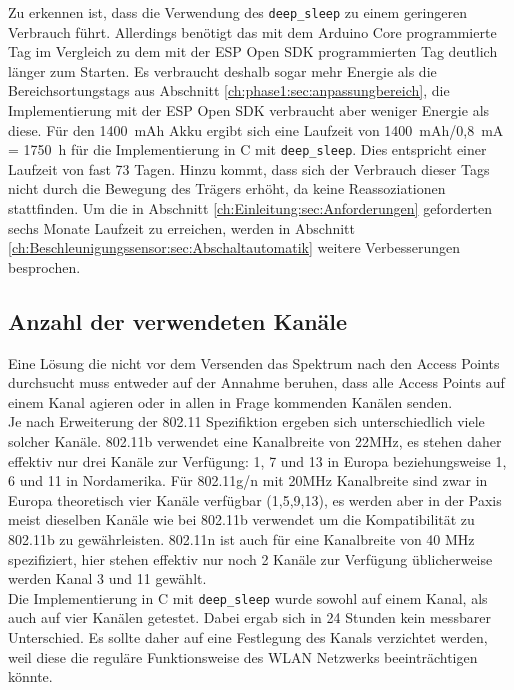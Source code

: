 
Zu erkennen ist, dass die Verwendung des \texttt{deep\_sleep} zu einem geringeren Verbrauch führt. 
Allerdings benötigt das mit dem Arduino Core programmierte Tag im Vergleich zu dem mit der ESP Open SDK programmierten Tag deutlich länger zum Starten.
Es verbraucht deshalb sogar mehr Energie als die Bereichsortungstags aus Abschnitt \ref{ch:phase1:sec:anpassungbereich}, die Implementierung mit der ESP Open SDK verbraucht aber weniger Energie als diese.
Für den 1400\ mAh Akku ergibt sich eine Laufzeit von 1400\ mAh/0,8\ mA = 1750\ h für die Implementierung in C mit \texttt{deep\_sleep}.
Dies entspricht einer Laufzeit von fast 73 Tagen.
Hinzu kommt, dass sich der Verbrauch dieser Tags nicht durch die Bewegung des Trägers erhöht, da keine Reassoziationen stattfinden.
Um die in Abschnitt \ref{ch:Einleitung:sec:Anforderungen} geforderten sechs Monate Laufzeit zu erreichen, werden in Abschnitt \ref{ch:Beschleunigungssensor:sec:Abschaltautomatik} weitere Verbesserungen besprochen.

\subsection{Anzahl der verwendeten Kanäle}
Eine Lösung die nicht vor dem Versenden das Spektrum nach den Access Points durchsucht muss entweder auf der Annahme beruhen, dass alle Access Points auf einem Kanal agieren oder in allen in Frage kommenden Kanälen senden.\\
Je nach Erweiterung der 802.11 Spezifiktion ergeben sich unterschiedlich viele solcher Kanäle.
802.11b verwendet eine Kanalbreite von 22MHz, es stehen daher effektiv nur drei Kanäle zur Verfügung: 1, 7 und 13 in Europa beziehungsweise 1, 6 und 11 in Nordamerika.
Für 802.11g/n mit 20MHz Kanalbreite sind zwar in Europa theoretisch vier Kanäle verfügbar (1,5,9,13), es werden aber in der Paxis meist dieselben Kanäle wie bei 802.11b verwendet um die Kompatibilität zu 802.11b zu gewährleisten.
802.11n ist auch für eine Kanalbreite von 40 MHz spezifiziert, hier stehen effektiv nur noch 2 Kanäle zur Verfügung üblicherweise werden Kanal 3 und 11 gewählt.\\
Die Implementierung in C mit \texttt{deep\_sleep} wurde sowohl auf einem Kanal, als auch auf vier Kanälen getestet.
Dabei ergab sich in 24 Stunden kein messbarer Unterschied.
Es sollte daher auf eine Festlegung des Kanals verzichtet werden, weil diese die reguläre Funktionsweise des WLAN Netzwerks beeinträchtigen könnte.

